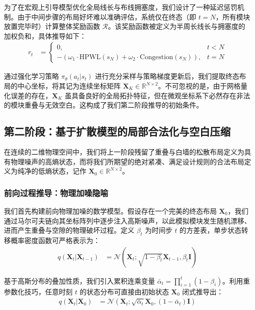 \documentclass[12pt, a4paper]{article}
\begin{document}
为了在宏观上引导模型优化全局线长与布线拥塞度，我们设计了一种延迟惩罚机制。由于中间步骤的布局好坏难以准确评估，系统仅在终态（即 $t=N$，所有模块放置完毕时）计算整体奖励函数 $\mathcal{R}$。该奖励函数被定义为半周长线长与拥塞度的加权负和，具体推导如下：
$$\begin{aligned} 
r_t &= \begin{cases} 
0, & t < N \\ 
-\left( \omega_1 \cdot \text{HPWL}(s_N) + \omega_2 \cdot \text{Congestion}(s_N) \right), & t = N 
\end{cases} 
\end{aligned}$$

通过强化学习策略 $\pi_\theta(a_t|s_t)$ 进行充分采样与策略梯度更新后，我们提取终态布局的中心坐标，将其记为连续坐标矩阵 $\mathbf{X}_K \in \mathbb{R}^{N \times 2}$。不可忽视的是，由于网格量化误差的存在，$\mathbf{X}_K$ 虽具备良好的全局拓扑特征，但在微观坐标系下必然存在非法的模块重叠与无效空白。这构成了我们第二阶段推导的初始条件。

\subsection{第二阶段：基于扩散模型的局部合法化与空白压缩}

在连续的二维物理空间中，我们将上一阶段残留了重叠与白墙的松散布局定义为具有物理噪声的高熵状态，而将我们所期望的绝对紧凑、满足设计规则的合法布局定义为纯净的低熵状态，记作 $\mathbf{X}_0 \in \mathbb{R}^{N \times 2}$。

\subsubsection{前向过程推导：物理加噪隐喻}

我们首先构建前向物理加噪的数学模型。假设存在一个完美的终态布局 $\mathbf{X}_0$，我们通过马尔可夫链向其坐标阵列中逐步注入高斯噪声，以此模拟模块发生随机漂移、进而产生重叠与空隙的物理破坏过程。定义 $\beta_t$ 为时间步 $t$ 的方差表，单步状态转移概率密度函数可严格表示为：
$$\begin{aligned} 
q(\mathbf{X}_t | \mathbf{X}_{t-1}) &= \mathcal{N}(\mathbf{X}_t; \sqrt{1-\beta_t}\mathbf{X}_{t-1}, \beta_t \mathbf{I}) 
\end{aligned}$$

基于高斯分布的叠加性质，我们引入累积连乘变量 $\bar{\alpha}_t = \prod_{i=1}^t (1-\beta_i)$。利用重参数化技巧，任意时刻 $t$ 的状态分布可直接由初始状态 $\mathbf{X}_0$ 闭式推导出：
$$\begin{aligned} 
q(\mathbf{X}_t | \mathbf{X}_0) &= \mathcal{N}(\mathbf{X}_t; \sqrt{\bar{\alpha}_t}\mathbf{X}_0, (1-\bar{\alpha}_t)\mathbf{I}) 
\end{aligned}$$
\end{document}

